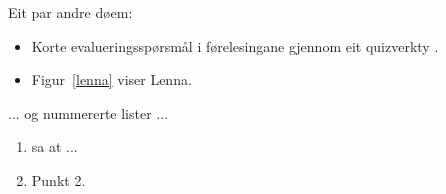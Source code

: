\documentclass[nynorsk]{mnt}
\begin{document}
Eit par andre døem:
\begin{itemize}
  \item 
Korte evalueringsspørsmål i førelesingane gjennom eit
      quizverkty \citep{hgs2018udit}.
  \item 
Figur~\ref{lenna} viser Lenna.
\end{itemize}

... og nummererte lister ...
\begin{enumerate}
  \item 
    \cite{biggs11a} sa at ...
  \item Punkt 2.
\end{enumerate}




\end{document}
